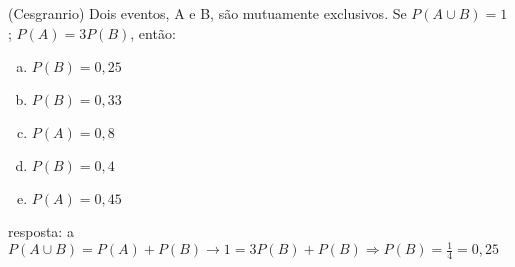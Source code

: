 \begin{ex}
(Cesgranrio) Dois eventos, A e B, são mutuamente exclusivos.
Se $P(A\cup B) = 1$ ; $P(A) =3P(B)$, então:
   \begin{enumerate}[(a)]
   \item $P(B) = 0,25$
   \item $P(B) = 0,33$
   \item $P(A) = 0,8$
   \item $P(B) = 0,4$
   \item $P(A) = 0,45$
   \end{enumerate}
     \begin{sol}
      resposta: a \\
      $P(A\cup B)=P(A) + P(B) \rightarrow 1=3P(B)+P(B)\Longrightarrow P(B)=\frac{1}{4}=0,25$
     \end{sol}
\end{ex}